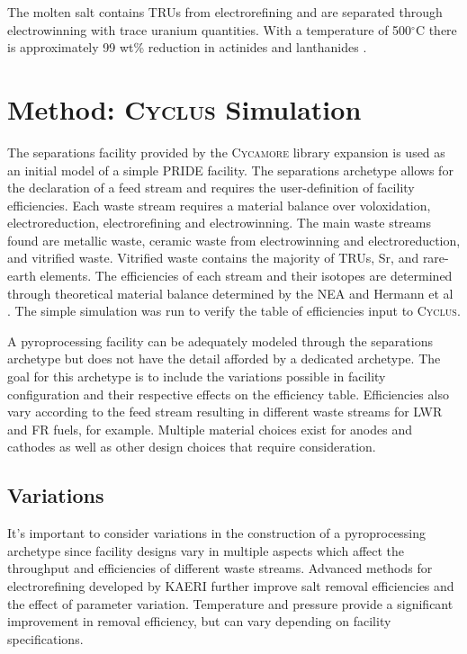 \documentclass{anstrans}
\newcommand{\Cyclus}{\textsc{Cyclus}\xspace}%
\newcommand{\Cycamore}{\textsc{Cycamore}\xspace}%
\begin{document}
The molten salt contains TRUs from electrorefining and are separated through electrowinning with trace uranium quantities. 
With a temperature of 500$^{\circ}$C there is approximately 99 wt\% reduction in actinides and lanthanides \cite{flowsheet_1998}. 
\section{Method: \Cyclus Simulation}
The separations facility provided by the \Cycamore library expansion is used as an initial model of a simple PRIDE facility. 
The separations archetype allows for the declaration of a feed stream and requires the user-definition of facility efficiencies. 
Each waste stream requires a material balance over voloxidation, electroreduction, electrorefining and electrowinning. The main 
waste streams found are metallic waste, ceramic waste from electrowinning and electroreduction, and vitrified waste. Vitrified 
waste contains the majority of TRUs, Sr, and rare-earth elements. The efficiencies of each stream and their isotopes are 
determined through theoretical material balance determined by the NEA and Hermann et al \cite{flowsheet_1998,herrmann_separation_2010}. 
The simple simulation was run to verify the table of efficiencies input to \Cyclus.

A pyroprocessing facility can be adequately modeled through the separations archetype but does not have the detail afforded 
by a dedicated archetype. The goal for this archetype is to include the variations possible in facility configuration and 
their respective effects on the efficiency table. Efficiencies also vary according to the feed stream resulting in different 
waste streams for LWR and FR fuels, for example. Multiple material choices exist for anodes and cathodes as well as other 
design choices that require consideration. 

\subsection{Variations}
It's important to consider variations in the construction of a pyroprocessing archetype since facility designs vary in 
multiple aspects which affect the throughput and efficiencies of different waste streams. Advanced methods for electrorefining 
developed by KAERI \cite{lee_advanced_nodate} further improve salt removal efficiencies and the effect of parameter variation. 
Temperature and pressure provide a significant improvement in removal efficiency, but can vary depending on facility specifications. 
\end{document}
